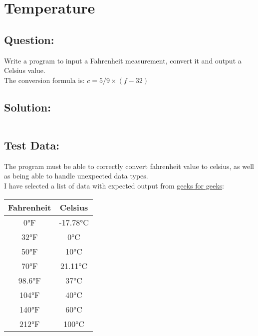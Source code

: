 \documentclass[main.tex]{subfiles}
\begin{document}
    \section{Temperature}
        \subsection*{Question:}
        Write a program to input a Fahrenheit measurement, convert it and output a Celsius value.\\
        The conversion formula is: \(c = 5 / 9 \times (f - 32)\)
            
        \subsection*{Solution:}
            \inputminted{cpp}{../Tasks/02-Temperature/Temperature.cpp}

        \newpage
        \subsection*{Test Data:}
            The program must be able to correctly convert fahrenheit value to celsius,
            as well as being able to handle unexpected data types.\\

            I have selected a list of data with expected output from \href{https://www.geeksforgeeks.org/fahrenheit-to-celsius-formula/}{geeks for geeks}:
            \begin{center}
                \begin{tabular}{c c}
                    \hline
                    \textbf{Fahrenheit} & \textbf{Celsius} \\
                    \hline
                    0°F & -17.78°C \\
                    32°F & 0°C \\
                    50°F & 10°C \\
                    70°F & 21.11°C \\
                    98.6°F & 37°C \\
                    104°F & 40°C \\
                    140°F & 60°C \\
                    212°F & 100°C \\
                    \hline
                \end{tabular}
            \end{center}
\end{document}
